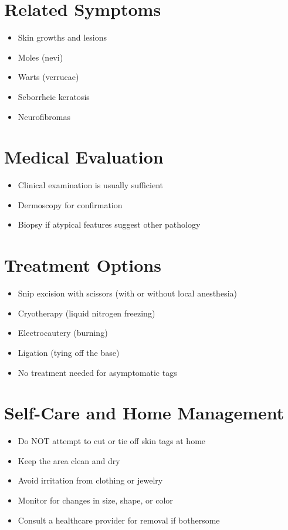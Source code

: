 \section*{Related Symptoms}
\begin{itemize}
\item Skin growths and lesions
\item Moles (nevi)
\item Warts (verrucae)
\item Seborrheic keratosis
\item Neurofibromas
\end{itemize}

\section*{Medical Evaluation}
\begin{itemize}
\item Clinical examination is usually sufficient
\item Dermoscopy for confirmation
\item Biopsy if atypical features suggest other pathology
\end{itemize}

\section*{Treatment Options}
\begin{itemize}
\item Snip excision with scissors (with or without local anesthesia)
\item Cryotherapy (liquid nitrogen freezing)
\item Electrocautery (burning)
\item Ligation (tying off the base)
\item No treatment needed for asymptomatic tags
\end{itemize}

\section*{Self-Care and Home Management}
\begin{itemize}
\item Do NOT attempt to cut or tie off skin tags at home
\item Keep the area clean and dry
\item Avoid irritation from clothing or jewelry
\item Monitor for changes in size, shape, or color
\item Consult a healthcare provider for removal if bothersome
\end{itemize}

